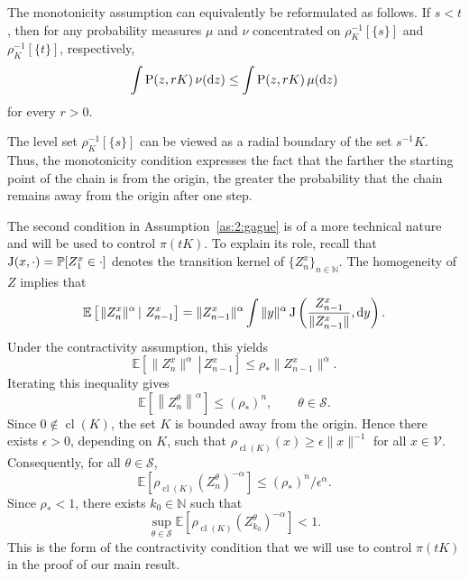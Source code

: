 \documentclass[preprint,12pt]{elsarticle}
\theoremstyle{definition}
\theoremstyle{remark}
\newcommand{\xbf}{{ x}}
\newcommand{\ybf}{{ y}}
\newcommand{\zbf}{{ z}}
\newcommand{\Zbf}{{ Z}}
\newcommand{\1}{{\mathbf 1}}
\numberwithin{equation}{section}
\newcommand{\Ebb}{\mathbb{E}}  %
\newcommand{\Nbb}{\mathbb{N}}
\newcommand{\Pbb}{\mathbb{P}}
\newcommand{\ud}{{\rm d}}
\newcommand{\Prm}{{\rm P}}
\newcommand{\Krm}{{\rm J}}
\newcommand{\Vcal}{\mathcal{V}}
\newcommand{\Scal}{\mathcal{S}}
\begin{document}
  The monotonicity assumption can equivalently be reformulated as follows. 
  If $s < t$, then for any probability measures $\mu$ and $\nu$ 
  concentrated on $\rho_{K}^{-1}[\{s\}]$ and $\rho_{K}^{-1}[\{t\}]$, respectively, 
  \begin{equation}
    \int \Prm(\zbf, rK) \,\nu(\ud \zbf) 
    \leq \int \Prm(\zbf, rK) \,\mu(\ud \zbf)
  \end{equation}
  for every $r > 0$.

  The level set $\rho_K^{-1}[\{s\}]$ can be viewed as a radial boundary of 
  the set $s^{-1}K$. Thus, the monotonicity condition expresses the fact that 
  the farther the starting point of the chain is from the origin, the greater 
  the probability that the chain remains away from the origin after one step.
  
  The second condition in Assumption~\ref{as:2:gague}
  is of a more technical nature and will be used to control $\pi(tK)$.
  To explain its role, recall that $\Krm(\xbf,\cdot) = \Pbb[\Zbf_1^\xbf \in \cdot]$
  denotes the transition kernel of $\{\Zbf_n^\xbf\}_{n \in \mathbb{N}}$.
  The homogeneity of $\Zbf$ implies that
  \begin{equation*}
    \Ebb\left[ \left. \|\Zbf_n^\xbf\|^\alpha \,\right|\, \Zbf_{n-1}^\xbf \right]
      = \|\Zbf_{n-1}^\xbf\|^\alpha \int \|\ybf\|^\alpha
      \,\Krm \left(\frac{\Zbf_{n-1}^\xbf}{\|\Zbf_{n-1}^\xbf\|}, \ud \ybf\right).
  \end{equation*}
  Under the contractivity assumption, this yields
  \begin{equation*}
    \Ebb\left[ \left. \|\Zbf_n^\xbf\|^\alpha \,\right|\, \Zbf_{n-1}^\xbf \right]
    \leq \rho_* \|\Zbf_{n-1}^\xbf\|^\alpha.
  \end{equation*}
  Iterating this inequality gives
  \begin{equation}\label{eq:2:boundZbf}
    \Ebb\left[ \left\|\Zbf_n^\theta\right\|^\alpha \right]
      \leq \left(\rho_*\right)^n,
      \qquad \theta \in \Scal.
  \end{equation}
  Since $0 \notin \operatorname{cl}(K)$, the set $K$ is bounded away from the origin. 
  Hence there exists $\epsilon > 0$, depending on $K$, such that 
  $\rho_{\operatorname{cl}(K)}(\xbf) \geq \epsilon \|\xbf\|^{-1}$ for all $\xbf \in \Vcal$.
  Consequently, for all $\theta \in \Scal$,
  \begin{equation*}
    \Ebb \left[ \rho_{\operatorname{cl}(K)}\!\left(\Zbf_n^\theta\right)^{-\alpha} \right] 
    \leq \left(\rho_*\right)^n / \epsilon^{\alpha}.
  \end{equation*}
  Since $\rho_* < 1$, there exists $k_0 \in \Nbb$ such that
  \begin{equation}\label{eq:2:contr2.0}
    \sup_{\theta \in \Scal} 
    \Ebb \left[ \rho_{\operatorname{cl}(K)}\!\left(\Zbf_{k_0}^\theta\right)^{-\alpha} \right] 
    < 1.
  \end{equation}
  This is the form of the contractivity condition that we will use to control 
  $\pi(tK)$ in the proof of our main result.
        
\end{document}
